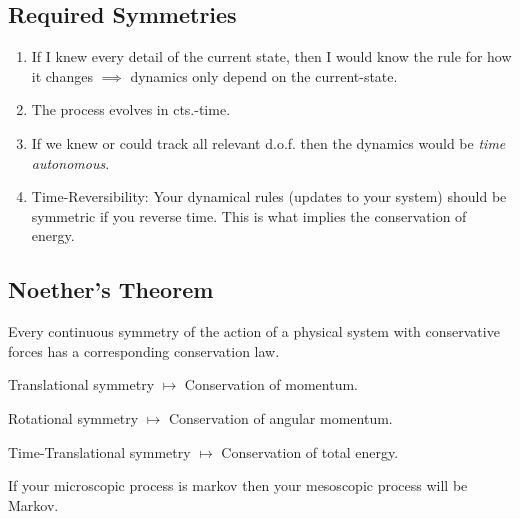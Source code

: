 \subsection{Required Symmetries}
\begin{enumerate}
    \item If I knew every detail of the current state, then I would know the rule for how it changes $\implies$ dynamics only depend on the current-state.
    \item The process evolves in cts.-time.
    \item If we knew or could track all relevant d.o.f. then the dynamics would be \textit{time autonomous}.
    \item Time-Reversibility: Your dynamical rules (updates to your system) should be symmetric if you reverse time. This is what implies the conservation of energy.
\end{enumerate}

\subsection{Noether's Theorem}
Every continuous symmetry of the action of a physical system with conservative forces has a corresponding conservation law.

Translational symmetry $\mapsto$ Conservation of momentum.

Rotational symmetry $\mapsto$ Conservation of angular momentum.

Time-Translational symmetry $\mapsto$ Conservation of total energy.

% 
If your microscopic process is markov then your mesoscopic process will be Markov.
